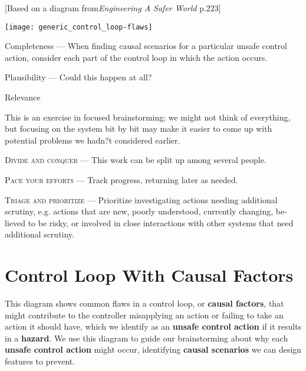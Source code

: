 \documentclass[letterpaper]{tufte-book}
\begin{document}

[Based on a diagram from\emph{Engineering A Safer World} p.223]
\begin{center}
\texttt{[image: generic\_control\_loop-flaws]}
\end{center}


\begin{compactitem}
\item Completeness --- When finding causal scenarios for a particular unsafe control action, consider each part of the control loop in which the action occurs.
\item Plausibility --- Could this happen at all?
\item Relevance
\end{compactitem}


This is an exercise in focused brainstorming; we might not think of everything, but focusing on the system bit by bit may make it easier to come up with potential problems we hadn?t considered earlier.

\begin{compactitem}
\item \textsc{Divide and conquer} --- This work can be split up among several people.
\item \textsc{Pace your efforts} --- Track progress, returning later as needed.
\item \textsc{Triage and prioritize} --- Prioritize investigating actions needing additional scrutiny, e.g. actions that are new, poorly understood, currently changing, be-lieved to be risky, or involved in close interactions with other systems that need additional scrutiny.
\end{compactitem}  

\section{Control Loop With Causal Factors}

This diagram shows common flaws in a control loop, or \textbf{causal factors}, that might contribute to the controller misapplying an action or failing to take an action it should have, which we identify as an \textbf{unsafe control action} if it results in a \textbf{hazard}. We use this diagram to guide our brainstorming about why each \textbf{unsafe control action} might occur, identifying \textbf{causal scenarios} we can design features to prevent.
\end{document}

